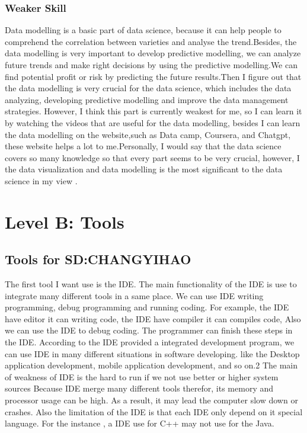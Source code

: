 \documentclass[a4paper, 11pt]{report}
\begin{document}
\subsubsection{Weaker Skill}
	Data modelling is a basic part of data science, because it can help people to comprehend the correlation between varieties and analyse the trend.Besides, the data modelling is very important to develop predictive modelling, we can analyze future trends and make right decisions by using the predictive modelling.We can find potential profit or risk by predicting the future results.Then I figure out that the data modelling is very crucial for the data science, which includes the data analyzing, developing predictive modelling and improve the data management strategies. However, I think this part is currently weakest for me, so I can learn it by watching the videos that are useful for the data modelling, besides I can learn the data modelling on the website,such as Data camp, Coursera, and Chatgpt, these website helps a lot to me.Personally, I would say that the data science covers so many knowledge so that every part seems to be very crucial, however, I the data visualization and data modelling is the most significant to the data science in my view .

\newpage
\section{Level B: Tools}
\subsection{Tools for SD:CHANGYIHAO}
The first tool I want use is the IDE. The main functionality of the IDE is use to integrate many different tools in a same place. We can use IDE writing programming, debug programming and running coding. For example, the IDE have editor it can writing code, the IDE have compiler it can compiles code, Also we can use the IDE to debug coding. The programmer can finish these steps in the IDE. 
According to the IDE provided a integrated development program, we can use IDE in many different situations in software developing. like the Desktop application development, mobile application development, and so on.2
The main of weakness of IDE is the hard to run if we not use better or higher system sources
Because IDE merge many different tools therefor, its memory and processor usage can be high. As a result, it may lead the computer slow down or crashes. Also the limitation of the IDE is that each IDE only depend on it special language. For the instance , a IDE use for C++  may not use for the Java.
\end{document}

